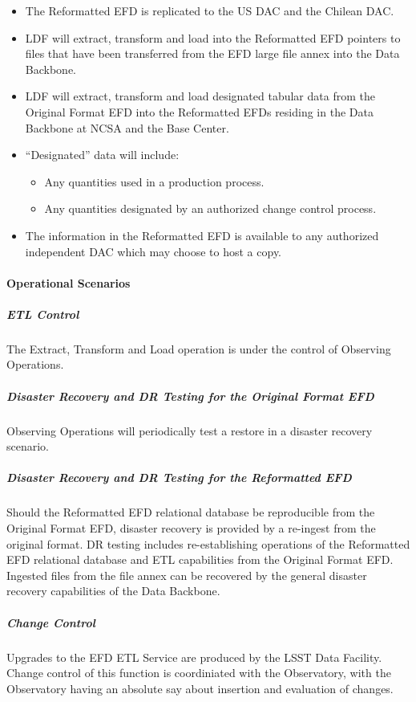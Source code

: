 \begin{itemize}
\item The Reformatted EFD is replicated to the US DAC and the Chilean DAC.
\item LDF will extract, transform and load into the Reformatted EFD pointers to files
that have been transferred from the EFD large file annex into the Data Backbone.
\item LDF will extract, transform and load designated tabular data from the
Original Format EFD into the Reformatted EFDs residing in the Data Backbone at
NCSA and the Base Center.
\item “Designated” data will include:
  \begin{itemize}
  \item Any quantities used in a production process.
  \item Any quantities designated by an authorized change control process.
  \end{itemize}
\item The information in the Reformatted EFD is available to any authorized independent
DAC which may choose to host a copy.
\end{itemize}

\paragraph{Operational Scenarios}

\subparagraph{ETL Control}

The Extract, Transform and Load operation is under the control of Observing Operations.

\subparagraph{Disaster Recovery and DR Testing for the Original Format EFD}

Observing Operations will periodically test a restore in a disaster recovery scenario.

\subparagraph{Disaster Recovery and DR Testing for the Reformatted EFD}

Should the Reformatted EFD relational database be reproducible from the
Original Format EFD, disaster recovery is provided by a re-ingest from the
original format. DR testing includes re-establishing operations of the Reformatted
EFD relational database and ETL capabilities from the Original Format EFD. Ingested
files from the file annex can be recovered by the general disaster recovery capabilities
of the Data Backbone.

\subparagraph{Change Control}

Upgrades to the EFD ETL Service are produced by the LSST Data Facility.
Change control of this function is coordiniated with the Observatory, with the
Observatory having an absolute say about insertion and evaluation of changes.
